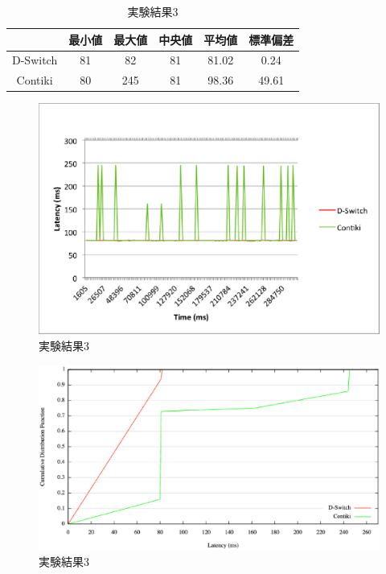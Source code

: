 \begin{table}[htbp]
  \centering
  \caption{実験結果3}
  \begin{tabular}{|c||c|c|c|c|c|} \hline
    \backslashbox{}{} & 最小値 & 最大値 & 中央値 & 平均値 & 標準偏差 \\ \hline \hline
    D-Switch & 81 & 82 & 81 & 81.02 & 0.24 \\ \hline
    Contiki & 80 & 245 & 81 & 98.36 & 49.61 \\ \hline
  \end{tabular}
  \label{tab:latency3}
\end{table}

\begin{figure}[htbp]
 \begin{center}
  \includegraphics[width=120mm]{./images/latency3.eps}
 \end{center}
 \caption{実験結果3}
 \label{fig:latency3}
\end{figure}

\begin{figure}[htbp]
 \begin{center}
  \includegraphics[width=120mm]{./images/cdf3.eps}
 \end{center}
 \caption{実験結果3}
 \label{fig:cdf3}
\end{figure}



